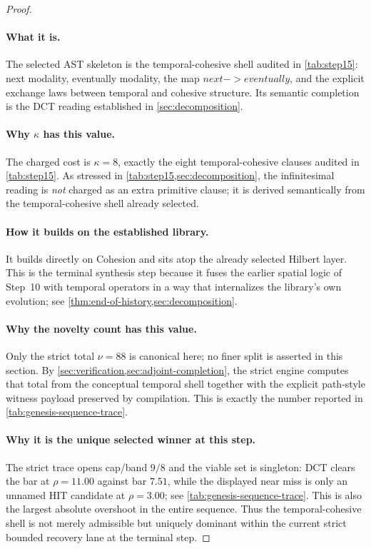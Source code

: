 \documentclass[11pt,a4paper]{article}
\def\to{->}%
\def\bigcirc{next}%
\def\Diamond{eventually}%
\theoremstyle{plain}
\theoremstyle{definition}
\theoremstyle{remark}
\begin{document}
\begin{proof}
\paragraph{What it is.}
The selected AST skeleton is the temporal-cohesive shell audited in
\cref{tab:step15}: next modality, eventually modality, the map
$\bigcirc\to\Diamond$, and the explicit exchange laws between temporal and
cohesive structure.
Its semantic completion is the DCT reading established in
\cref{sec:decomposition}.

\paragraph{Why $\kappa$ has this value.}
The charged cost is $\kappa=8$, exactly the eight temporal-cohesive clauses
audited in \cref{tab:step15}.
As stressed in \cref{tab:step15,sec:decomposition}, the infinitesimal reading is
\emph{not} charged as an extra primitive clause; it is derived semantically from
the temporal-cohesive shell already selected.

\paragraph{How it builds on the established library.}
It builds directly on Cohesion and sits atop the already selected Hilbert layer.
This is the terminal synthesis step because it fuses the earlier spatial logic
of Step~10 with temporal operators in a way that internalizes the library's own
evolution; see \cref{thm:end-of-history,sec:decomposition}.

\paragraph{Why the novelty count has this value.}
Only the strict total $\nu=88$ is canonical here; no finer split is asserted in
this section.
By \cref{sec:verification,sec:adjoint-completion}, the strict engine computes
that total from the conceptual temporal shell together with the explicit
path-style witness payload preserved by compilation.
This is exactly the number reported in \cref{tab:genesis-sequence-trace}.

\paragraph{Why it is the unique selected winner at this step.}
The strict trace opens cap/band $9/8$ and the viable set is singleton:
DCT clears the bar at $\rho=11.00$ against bar $7.51$, while the displayed near
miss is only an unnamed HIT candidate at $\rho=3.00$; see
\cref{tab:genesis-sequence-trace}.
This is also the largest absolute overshoot in the entire sequence.
Thus the temporal-cohesive shell is not merely admissible but uniquely dominant
within the current strict bounded recovery lane at the terminal step.
\end{proof}
\end{document}
